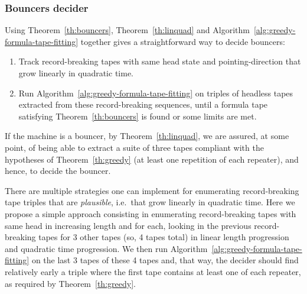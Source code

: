 \subsubsection{Bouncers decider}

Using Theorem~\ref{th:bouncers}, Theorem~\ref{th:linquad} and Algorithm~\ref{alg:greedy-formula-tape-fitting} together gives a straightforward way to decide bouncers:

\begin{enumerate}
    \item Track record-breaking tapes with same head state and pointing-direction that grow linearly in quadratic time.
    \item Run Algorithm~\ref{alg:greedy-formula-tape-fitting} on triples of headless tapes extracted from these record-breaking sequences, until a formula tape satisfying Theorem~\ref{th:bouncers} is found or some limits are met.


\end{enumerate}


If the machine is a bouncer, by Theorem~\ref{th:linquad}, we are assured, at some point, of being able to extract a suite of three tapes compliant with the hypotheses of Theorem~\ref{th:greedy} (at least one repetition of each repeater), and hence, to decide the bouncer.

There are multiple strategies one can implement for enumerating record-breaking tape triples that are \textit{plausible}, i.e.\ that grow linearly in quadratic time. Here we propose a simple approach consisting in enumerating record-breaking tapes with same head in increasing length and for each, looking in the previous record-breaking tapes  for 3 other tapes (so, 4 tapes total) in linear length progression and quadratic time progression. We then run Algorithm~\ref{alg:greedy-formula-tape-fitting} on the last 3 tapes of these 4 tapes and, that way, the decider should find relatively early a triple where the first tape contains at least one of each repeater, as required by Theorem~\ref{th:greedy}.

